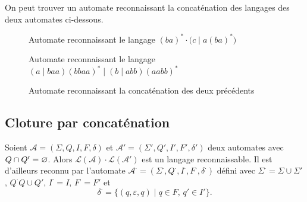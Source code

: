 \begin{exm}
	On peut trouver un automate reconnaissant la concaténation des langages des deux automates ci-dessous.
	\begin{figure}[H]
		\centering
		\caption{Automate reconnaissant le langage $(ba)^* \cdot \big(c \mid a(ba)^*\big)$}
	\end{figure}
	\begin{figure}[H]
		\centering
		\caption{Automate reconnaissant le langage $(a \mid baa)(bbaa)^*  \mid (b \mid abb)(aabb)^*$}
	\end{figure}
	\begin{figure}[H]
		\centering
		\caption{Automate reconnaissant la concaténation des deux précédents}
	\end{figure}
\end{exm}

\subsection{Cloture par concaténation}

\begin{prop}
	Soient $\mathcal{A} = (\Sigma, Q, I, F, \delta)$\/ et $\mathcal{A}' = (\Sigma', Q', I', F', \delta')$\/ deux automates avec $Q \cap Q' = \varnothing$. Alors $\mathcal{L}(\mathcal{A}) \cdot \mathcal{L}(\mathcal{A}')$\/ est un langage reconnaissable. Il est d'ailleurs reconnu par l'automate $\mathcal{A}^\cdot = (\Sigma^\cdot, Q^\cdot, I^\cdot, F^\cdot, \delta^\cdot)$\/ défini avec $\Sigma^\cdot= \Sigma \cup \Sigma'$, $Q^\cdot Q \cup Q'$, $I^\cdot = I$, $F^\cdot = F'$\/ et \[
		\delta^\cdot = \{(q,\varepsilon,q)  \mid q \in F,\, q' \in I'\}.
	\]
\end{prop}

